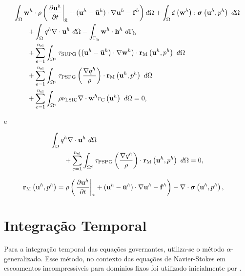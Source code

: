 \documentclass[tese_patricia]{subfiles}%
\begin{document}
\begin{align}
	\begin{split}
		&\int_{\domain} \utesth \cdot \density\left(\left.\frac{\partial\velocityh}{\partial t}\right|_{\posALE}+(\velocityh-\velocityALEh)\cdot \nabla\velocityh - \sbodyforce^h\right) d\domain +\int_{\domain} \strainratetensor \left(\utesth\right) : \stresstensor \left(\velocityh,\pressh\right)\ d\domain\\ &\qquad+ 
		\int_{\domain}\ptesth \nabla \cdot \velocityh \ d\domain 
		- \int_{\boundaryH}\utesth \cdot \straction^h\ d\boundaryH \\ 
		&\qquad+ \sum_{e=1}^{\nel} \int_{\domainE} \SUPG \left(\left(\velocityh- \velocityALEh\right) \cdot \nabla\utesth\right) \cdot \resMom\left(\velocityh,\pressh \right)\  d\domain\\
		&\qquad+ \sum_{e=1}^{\nel} \int_{\domainE} \PSPG \left(\frac{\nabla \ptesth}{\density}\right) \cdot \resMom\left(\velocityh,\pressh\right) \  d\domain\\
		&\qquad+ \sum_{e=1}^{\nel} \int_{\domainE} \density \LSIC \nabla \cdot \utesth \resPre\left(\velocityh\right)\  d\domain = 0,
		\label{eq:FinalSystem}
	\end{split}
\end{align}

\noindent e

\begin{align}
	\begin{split}
		&\int_{\Omega}q^h \nabla \cdot \mathbf{u}^h \ d\Omega \\ 
		&\qquad+ \sum_{e=1}^{n_{\mathrm{el}}} \int_{\Omega^e} \tau_{\mathrm{PSPG}} \left(\frac{\nabla q^h}{\rho}\right) \cdot \mathbf{r}_{\mathrm{M}}\left(\mathbf{u}^h,p^h\right) \  d\Omega = 0,
		\label{eq:RC}
	\end{split}
\end{align}

\begin{align}
	\mathbf{r}_{\mathrm{M}}\left(\mathbf{u}^h,p^h\right)&=\rho\left(\left.\frac{\partial\mathbf{u}^h}{\partial t}\right|_{\bar{\mathbf{x}}}+(\mathbf{u}^h-\bar{\mathbf{u}}^h)\cdot \nabla\mathbf{u}^h - \mathbf{f}^h\right) - \nabla \cdot \boldsymbol{\sigma}\left(\mathbf{u}^h,p^h\right),
\end{align}


\section{Integração Temporal}\label{sec:IntegTemp}

Para a integração temporal das equações governantes, utiliza-se o método $\alpha$-generalizado. Esse método, no contexto das equações de Navier-Stokes em escoamentos incompressíveis para domínios fixos foi utilizado inicialmente por .
\end{document}
